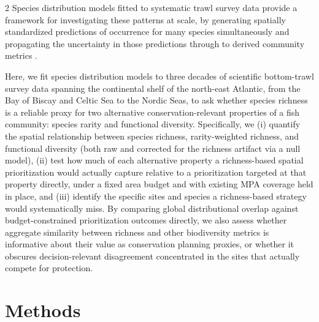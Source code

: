 \begin{spacing}{2}
Species distribution models fitted to systematic trawl survey data provide a framework for investigating these patterns at scale, by generating spatially standardized predictions of occurrence for many species simultaneously and propagating the uncertainty in those predictions through to derived community metrics \citep{wartonManyVariablesJoint2015, ovaskainenHowMakeMore2017, ovaskainen_abrego_2020}.

Here, we fit species distribution models to three decades of scientific bottom-trawl survey data spanning the continental shelf of the north-east Atlantic, from the Bay of Biscay and Celtic Sea to the Nordic Seas, to ask whether species richness is a reliable proxy for two alternative conservation-relevant properties of a fish community: species rarity and functional diversity. Specifically, we (i) quantify the spatial relationship between species richness, rarity-weighted richness, and functional diversity (both raw and corrected for the richness artifact via a null model), (ii) test how much of each alternative property a richness-based spatial prioritization would actually capture relative to a prioritization targeted at that property directly, under a fixed area budget and with existing MPA coverage held in place, and (iii) identify the specific sites and species a richness-based strategy would systematically miss. By comparing global distributional overlap against budget-constrained prioritization outcomes directly, we also assess whether aggregate similarity between richness and other biodiversity metrics is informative about their value as conservation planning proxies, or whether it obscures decision-relevant disagreement concentrated in the sites that actually compete for protection.
\section{Methods}


\end{spacing}
